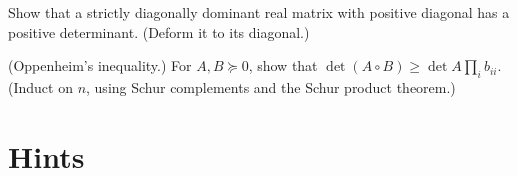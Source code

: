 \begin{exercise}[$\star\star$]\label{linear:ex:diagdomdet}
Show that a strictly diagonally dominant real matrix with positive diagonal has a positive determinant. (Deform it to its diagonal.)
\end{exercise}

\begin{exercise}[$\star\star\star$]\label{linear:ex:oppenheim}
(Oppenheim's inequality.) For $A,B\succeq0$, show that $\det(A\circ B)\ge\det A\prod_ib_{ii}$. (Induct on $n$, using Schur complements
and the Schur product theorem.)
\end{exercise}

\section{Hints}

